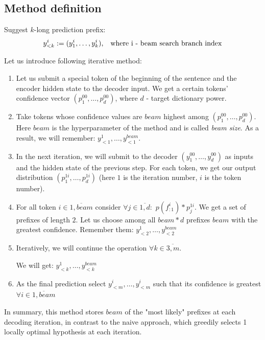 \documentclass[a4paper,14pt]{extarticle}
\begin{document}
	\subsection{Method definition}
	Suggest $k$-long prediction prefix:
	\begin{equation}
		y_{<k}^{i} := (y_1^{i}, \dots, y_k^{i}) \text{, \,\, where i - beam search branch index}
	\end{equation}
	
	Let us introduce following iterative method:
	
	\begin{enumerate}
		\item Let us submit a special token of the beginning of the sentence and the encoder hidden state to the decoder input. We get a certain tokens' confidence vector $(p_1^{00}, \dots, p_d^{00})$, where $d$ - target dictionary power.
		
		\item Take tokens whose confidence values are $beam$ highest among $ (p_1^{00}, \dots, p_d^{00})$. Here $beam$ is the hyperparameter of the method and is called \textit{beam size}. As a result, we will remember: $y_{<1}^1, \dots, y_{<1}^{beam}$. 
		
		\item In the next iteration, we will submit to the decoder $(y_1^{00}, \dots, y_d^{00})$ as inputs and the hidden state of the previous step. For each token, we get our output distribution $(p_1^{1i}, \dots, p_d^{1i})$ (here $1$ is the iteration number, $i$ is the token number).
		\item For all token $i \in \overline{1, beam}$ consider $\forall j \in \overline{1, d}: \,\, p(f_{:1}^i) * p_j^{1i}$. We get a set of prefixes of length $2$. Let us choose among all $beam * d$ prefixes $beam$ with the greatest confidence. Remember them: $y_{<2}^1, \dots, y_{<2}^{beam}$
		
		\item Iteratively, we will continue the operation $\forall k \in \overline{3, m}$. 
		
		We will get: $y_ {<k}^1, \dots, y_{<k}^{beam}$
		
		\item As the final prediction select $y_{<m}^i, \dots, y_{<m}^i$ such that its confidence is greatest $\forall i \in \overline{1, beam}$
	\end{enumerate}
	
	In summary, this method stores $beam$ of the "most likely" prefixes at each decoding iteration, in contrast to the naive approach, which greedily selects 1 locally optimal hypothesis at each iteration.
	
\end{document}
